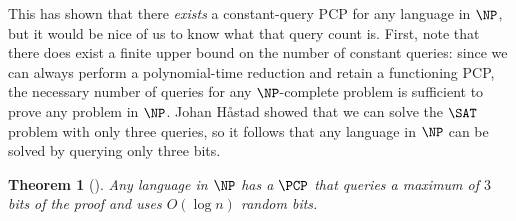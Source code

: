\documentclass[english,12pt]{reedthesis}
\theoremstyle{plain}
\newtheorem{thm}{Theorem}[section]
\theoremstyle{definition}
\newtheorem{defn}[defn]{Definition}
\theoremstyle{remark}
\begin{document}
This has shown that there \emph{exists} a constant-query PCP for any language in
$\NP$, but it would be nice of us to know what that query count is. First, note
that there does exist a finite upper bound on the number of constant queries:
since we can always perform a polynomial-time reduction and retain a functioning
PCP, the necessary number of queries for any $\NP$-complete problem is
sufficient to prove any problem in $\NP$. Johan H\r{a}stad showed that we can
solve the $\SAT$ problem with only three queries, so it follows that any
language in $\NP$ can be solved by querying only three bits.

\begin{thm}[{\cite{Has97}}]\label{thm:pcp-max-queries}
  Any language in $\NP$ has a $\PCP$ that queries a maximum of $3$ bits of the
  proof and uses $O(\log n)$ random bits.
\end{thm}






\end{document}
